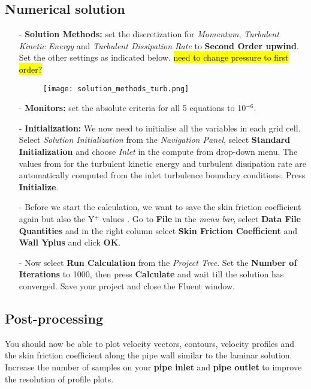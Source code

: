 \documentclass[11pt,a4paper,oneside]{scrartcl}
\newcommand\bfr[1]{\textcolor[rgb]{1,0.00,0.00}{\textbf{\textsf{#1}}}}
\begin{document}
\subsection{Numerical solution}

\begin{itemize}
    \item[-] \textbf{Solution Methods:} set the discretization for \emph{Momentum}, \emph{Turbulent Kinetic Energy} and \emph{Turbulent Dissipation Rate} to \bfr{Second Order upwind}. Set the other settings as indicated below. \hl{need to change pressure to first order?}
            \begin{figure}[H]
            \begin{center}
            \texttt{[image: solution\_methods\_turb.png]}
            \end{center}
            \end{figure}
    \item[-] \textbf{Monitors:} set the absolute criteria for all 5 equations to 10$^{-6}$.
    \item[-] \textbf{Initialization:} We now need to initialise all the variables in each grid cell. Select {\it Solution Initialization} from the {\it Navigation Panel}, select \bfr{Standard Initialization} and choose {\it Inlet} in the compute from drop-down menu. The values from for the turbulent kinetic energy and turbulent dissipation rate are automatically computed from the inlet turbulence boundary conditions. Press \bfr{Initialize}.
    \item[-] Before we start the calculation, we want to save the skin friction coefficient again but also the Y$^{+}$ values . Go to \bfr{File} in the \emph{menu bar}, select \bfr{Data File Quantities} and in the right column select \bfr{Skin Friction Coefficient} and \bfr{Wall Yplus} and click \bfr{OK}.
    \item[-] Now select \bfr{Run Calculation} from the \emph{Project Tree}. Set the \bfr{Number of Iterations} to 1000, then press \bfr{Calculate} and wait till the solution has converged. Save your project and close the Fluent window.
\end{itemize}



\subsection{Post-processing}
You should now be able to plot velocity vectors, contours, velocity profiles and the skin friction coefficient along the pipe wall similar to the laminar solution. Increase the number of samples on your \bfr{pipe inlet} and \bfr{pipe outlet} to improve the resolution of  profile plots.
\medskip
\end{document}
